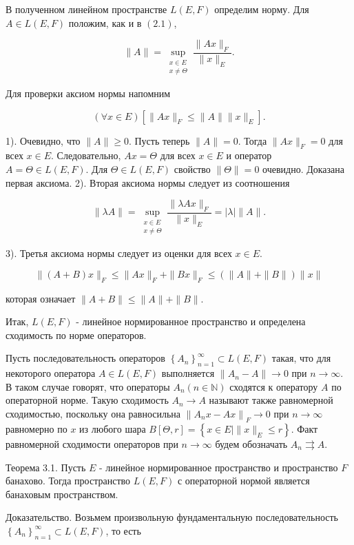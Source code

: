 В полученном линейном пространстве $L(E, F)$ определим норму. Для $A \in L(E, F)$ положим, как и в $(2.1)$,

$$
	\|A\|=\sup _{\substack{x \in E \\ x \neq \Theta}} \frac{\|A x\|_{F}}{\|x\|_{E}} .
$$

Для проверки аксиом нормы напомним

$$
	(\forall x \in E)\left[\|A x\|_{F} \leq\|A\|\|x\|_{E}\right] .
$$

1). Очевидно, что $\|A\| \geq 0$. Пусть теперь $\|A\|=0$. Тогда $\|A x\|_{F}=0$ для всех $x \in E$. Следовательно, $A x=\Theta$ для всех $x \in E$ и оператор $A=\Theta \in L(E, F)$. Для $\Theta \in L(E, F)$ свойство $\|\Theta\|=0$ очевидно. Доказана первая аксиома. 2). Вторая аксиома нормы следует из соотношения

$$
	\|\lambda A\|=\sup _{\substack{x \in E \\ x \neq \Theta}} \frac{\|\lambda A x\|_{F}}{\|x\|_{E}}=|\lambda|\|A\| .
$$

3). Третья аксиома нормы следует из оценки для всех $x \in E$.

$$
	\|(A+B) x\|_{F} \leq\|A x\|_{F}+\|B x\|_{F} \leq(\|A\|+\|B\|)\|x\|
$$

которая означает $\|A+B\| \leq\|A\|+\|B\|$.

Итак, $L(E, F)$ - линейное нормированное пространство и определена сходимость по норме операторов. 

Пусть последовательность операторов $\left\{A_{n}\right\}_{n=1}^{\infty} \subset L(E, F)$ такая, что для некоторого оператора $A \in L(E, F)$ выполняется $\left\|A_{n}-A\right\| \rightarrow 0$ при $n \rightarrow \infty$. В таком случае говорят, что операторы $A_{n}(n \in \mathbb{N})$ сходятся к оператору $A$ по операторной норме. Такую сходимость $A_{n} \rightarrow A$ называют также равномерной сходимостью, поскольку она равносильна $\left\|A_{n} x-A x\right\|_{F} \rightarrow 0$ при $n \rightarrow \infty$ равномерно по $x$ из любого шара $B[\Theta, r]=\left\{x \in E \mid\|x\|_{E} \leq r\right\}$. Факт равномерной сходимости операторов при $n \rightarrow \infty$ будем обозначать $A_{n} \rightrightarrows A$.

Теорема 3.1. Пусть $E$ - линейное нормированное пространство и пространство $F$ банахово. Тогда пространство $L(E, F)$ с операторной нормой является банаховым пространством.

Доказательство. Возьмем произвольную фундаментальную последовательность $\left\{A_{n}\right\}_{n=1}^{\infty} \subset L(E, F)$, то есть

